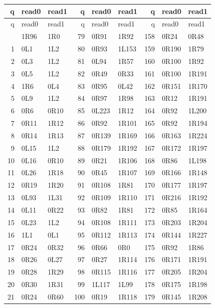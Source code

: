 \begingroup\small\ttfamily
\setlength{\tabcolsep}{5pt}
\begin{longtable}{rll@{\hspace{1.3em}}rll@{\hspace{1.3em}}rll}
\toprule
q & read0 & read1 & q & read0 & read1 & q & read0 & read1\\
\midrule\endfirsthead
\toprule
q & read0 & read1 & q & read0 & read1 & q & read0 & read1\\
\midrule\endhead
\bottomrule\endfoot
0 & 1R96 & 1R0 & 79 & 0R91 & 1R92 & 158 & 0R24 & 0R48\\
1 & 0L1 & 1L2 & 80 & 0R93 & 1L153 & 159 & 0R190 & 1R79\\
2 & 0L3 & 1L2 & 81 & 0L94 & 1R57 & 160 & 0R100 & 1R92\\
3 & 0L5 & 1L2 & 82 & 0R49 & 0R33 & 161 & 0R100 & 1R191\\
4 & 1R6 & 0L4 & 83 & 0R95 & 0L42 & 162 & 0R151 & 1R170\\
5 & 0L9 & 1L2 & 84 & 0R97 & 1R98 & 163 & 0R12 & 1R191\\
6 & 0R6 & 0R10 & 85 & 0L223 & 1R12 & 164 & 0R92 & 1L200\\
7 & 0R11 & 1R12 & 86 & 0R92 & 1R101 & 165 & 0R92 & 1R194\\
8 & 0R14 & 1R13 & 87 & 0R139 & 1R169 & 166 & 0R163 & 1R224\\
9 & 0L15 & 1L2 & 88 & 0R179 & 1R192 & 167 & 0R172 & 1R197\\
10 & 0L16 & 0R10 & 89 & 0R21 & 1R106 & 168 & 0R86 & 1L198\\
11 & 0L26 & 1R18 & 90 & 0R45 & 1R107 & 169 & 0R166 & 1R148\\
12 & 0R19 & 1R20 & 91 & 0R108 & 1R81 & 170 & 0R177 & 1R197\\
13 & 0L93 & 1L31 & 92 & 0R109 & 1R110 & 171 & 0R216 & 1R192\\
14 & 0L11 & 0R22 & 93 & 0R82 & 1R81 & 172 & 0R85 & 1R164\\
15 & 0L23 & 1L2 & 94 & 0R108 & 1R111 & 173 & 0R203 & 1R204\\
16 & 1L1 & 0L1 & 95 & 0R112 & 1R113 & 174 & 0R144 & 1R227\\
17 & 0R24 & 0R32 & 96 & 0R66 & 0R0 & 175 & 0R92 & 1R86\\
18 & 0R26 & 0L27 & 97 & 0R27 & 1R114 & 176 & 0R171 & 1R191\\
19 & 0R28 & 1R29 & 98 & 0R115 & 1R116 & 177 & 0R205 & 1R204\\
20 & 0R30 & 1R31 & 99 & 1L117 & 1L99 & 178 & 0R175 & 1R198\\
21 & 0R24 & 0R60 & 100 & 0R19 & 1R118 & 179 & 0R145 & 1R208\\

\end{longtable}
